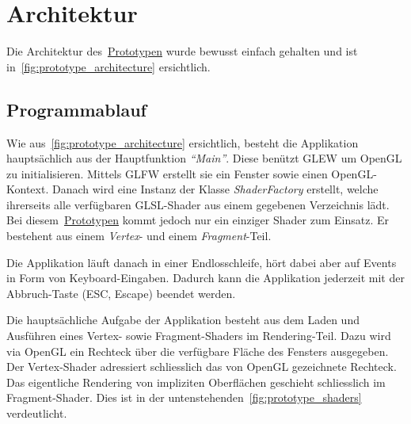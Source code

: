 
\section{Architektur}
\label{sec:architecture}

Die Architektur des~\hyperref[chap:prototype]{Prototypen} wurde bewusst einfach gehalten und ist
in~\autoref{fig:prototype_architecture} ersichtlich.


\subsection{Programmablauf}
\label{subsec:program_sequence}

Wie aus~\autoref{fig:prototype_architecture} ersichtlich, besteht die
Applikation hauptsächlich aus der Hauptfunktion \textit{``Main''}. Diese
benützt GLEW um OpenGL zu initialisieren. Mittels GLFW erstellt sie ein
Fenster sowie einen OpenGL-Kontext. Danach wird eine Instanz der Klasse
\textit{ShaderFactory} erstellt, welche ihrerseits alle verfügbaren
GLSL-Shader aus einem gegebenen Verzeichnis lädt. Bei diesem~\hyperref[chap:prototype]{Prototypen}
kommt jedoch nur ein einziger Shader zum Einsatz. Er bestehent aus einem
\textit{Vertex}- und einem \textit{Fragment}-Teil.

Die Applikation läuft danach in einer Endlosschleife, hört dabei aber
auf Events in Form von Keyboard-Eingaben. Dadurch kann die Applikation
jederzeit mit der Abbruch-Taste (ESC, Escape) beendet werden.

Die hauptsächliche Aufgabe der Applikation besteht aus dem Laden und
Ausführen eines Vertex- sowie Fragment-Shaders im Rendering-Teil.  Dazu
wird via OpenGL ein Rechteck über die verfügbare Fläche des Fensters
ausgegeben.  Der Vertex-Shader adressiert schliesslich das von OpenGL
gezeichnete Rechteck.  Das eigentliche Rendering von impliziten
Oberflächen geschieht schliesslich im Fragment-Shader. Dies ist in der
untenstehenden~\autoref{fig:prototype_shaders} verdeutlicht.

